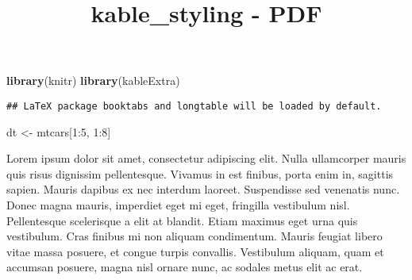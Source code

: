 \documentclass[]{article}
\title{kable\_styling - PDF}
\author{}
\date{}
\newenvironment{Shaded}{\begin{snugshade}}{\end{snugshade}}
\newcommand{\KeywordTok}[1]{\textcolor[rgb]{0.13,0.29,0.53}{\textbf{{#1}}}}
\newcommand{\DataTypeTok}[1]{\textcolor[rgb]{0.13,0.29,0.53}{{#1}}}
\newcommand{\DecValTok}[1]{\textcolor[rgb]{0.00,0.00,0.81}{{#1}}}
\newcommand{\StringTok}[1]{\textcolor[rgb]{0.31,0.60,0.02}{{#1}}}
\newcommand{\NormalTok}[1]{{#1}}
\begin{document}
\maketitle

\begin{Shaded}
\begin{Highlighting}[]
\KeywordTok{library}\NormalTok{(knitr)}
\KeywordTok{library}\NormalTok{(kableExtra)}
\end{Highlighting}
\end{Shaded}

\begin{verbatim}
## LaTeX package booktabs and longtable will be loaded by default.
\end{verbatim}

\begin{Shaded}
\begin{Highlighting}[]
\NormalTok{dt <-}\StringTok{ }\NormalTok{mtcars[}\DecValTok{1}\NormalTok{:}\DecValTok{5}\NormalTok{, }\DecValTok{1}\NormalTok{:}\DecValTok{8}\NormalTok{]}
\end{Highlighting}
\end{Shaded}

Lorem ipsum dolor sit amet, consectetur adipiscing elit. Nulla
ullamcorper mauris quis risus dignissim pellentesque. Vivamus in est
finibus, porta enim in, sagittis sapien. Mauris dapibus ex nec interdum
laoreet. Suspendisse sed venenatis nunc. Donec magna mauris, imperdiet
eget mi eget, fringilla vestibulum nisl. Pellentesque scelerisque a elit
at blandit. Etiam maximus eget urna quis vestibulum. Cras finibus mi non
aliquam condimentum. Mauris feugiat libero vitae massa posuere, et
congue turpis convallis. Vestibulum aliquam, quam et accumsan posuere,
magna nisl ornare nunc, ac sodales metus elit ac erat.

\begin{Shaded}
\end{Shaded}
\end{document}
